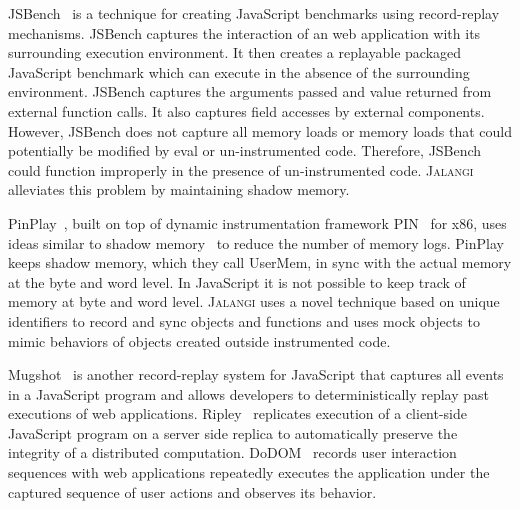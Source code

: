 \documentclass{sig-alternate}
\def\jalangi{\textsc{Jalangi}}
\begin{document}
JSBench~\cite{Richards:2011:ACJ:2048066.2048119} is a technique for
creating JavaScript benchmarks using record-replay mechanisms.
JSBench captures the interaction of an web application with its
surrounding execution environment.  It then creates a replayable
packaged JavaScript benchmark which can execute in the absence of the
surrounding environment.  JSBench captures the arguments passed and
value returned from external function calls.  It also captures field
accesses by external components.  However, JSBench does not capture
all memory loads or memory loads that could potentially be modified by
eval or un-instrumented code.  Therefore, JSBench could function
improperly in the presence of un-instrumented code.  \jalangi{}
alleviates this problem by maintaining shadow memory. %

PinPlay~\cite{Patil:2010:PFD:1772954.1772958}, built on top of dynamic
instrumentation framework PIN~\cite{Luk:2005:PBC:1065010.1065034} for
x86, uses ideas similar to shadow
memory~\cite{Narayanasamy:2006:ALO:1140277.1140303} to reduce the
number of memory logs.  PinPlay keeps shadow memory, which they call
UserMem, in sync with the actual memory at the byte and word level.
In JavaScript it is not possible to keep track of memory at byte and
word level.  \jalangi{} uses a novel technique based on unique
identifiers to record and sync objects and functions and uses mock
objects to mimic behaviors of objects created outside instrumented
code.  

Mugshot~\cite{Mickens:2010:MDC:1855711.1855722} is another
record-replay system for JavaScript that captures all events in a
JavaScript program and allows developers to deterministically replay
past executions of web applications.
Ripley~\cite{Vikram:2009:RAS:1653662.1653685} replicates execution of
a client-side JavaScript program on a server side replica to
automatically preserve the integrity of a distributed computation.
DoDOM~\cite{Pattabiraman:2010:DLD:1913797.1914375} records user
interaction sequences with web applications repeatedly executes the
application under the captured sequence of user actions and observes
its behavior. %
\end{document}
